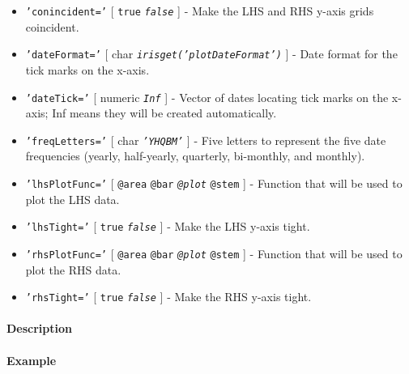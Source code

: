  \begin{itemize}
 \item
   \texttt{'conincident='} {[} \texttt{true} \textbar{}
   \emph{\texttt{false}} {]} - Make the LHS and RHS y-axis grids
   coincident.
 \item
   \texttt{'dateFormat='} {[} char \textbar{}
   \emph{\texttt{irisget('plotDateFormat')}} {]} - Date format for the
   tick marks on the x-axis.
 \item
   \texttt{'dateTick='} {[} numeric \textbar{} \emph{\texttt{Inf}} {]} -
   Vector of dates locating tick marks on the x-axis; Inf means they will
   be created automatically.
 \item
   \texttt{'freqLetters='} {[} char \textbar{} \emph{\texttt{'YHQBM'}}
   {]} - Five letters to represent the five date frequencies (yearly,
   half-yearly, quarterly, bi-monthly, and monthly).
 \item
   \texttt{'lhsPlotFunc='} {[} \texttt{@area} \textbar{} \texttt{@bar}
   \textbar{} \emph{\texttt{@plot}} \textbar{} \texttt{@stem} {]} -
   Function that will be used to plot the LHS data.
 \item
   \texttt{'lhsTight='} {[} \texttt{true} \textbar{}
   \emph{\texttt{false}} {]} - Make the LHS y-axis tight.
 \item
   \texttt{'rhsPlotFunc='} {[} \texttt{@area} \textbar{} \texttt{@bar}
   \textbar{} \emph{\texttt{@plot}} \textbar{} \texttt{@stem} {]} -
   Function that will be used to plot the RHS data.
 \item
   \texttt{'rhsTight='} {[} \texttt{true} \textbar{}
   \emph{\texttt{false}} {]} - Make the RHS y-axis tight.
 \end{itemize}
 
 \paragraph{Description}
 
 \paragraph{Example}


